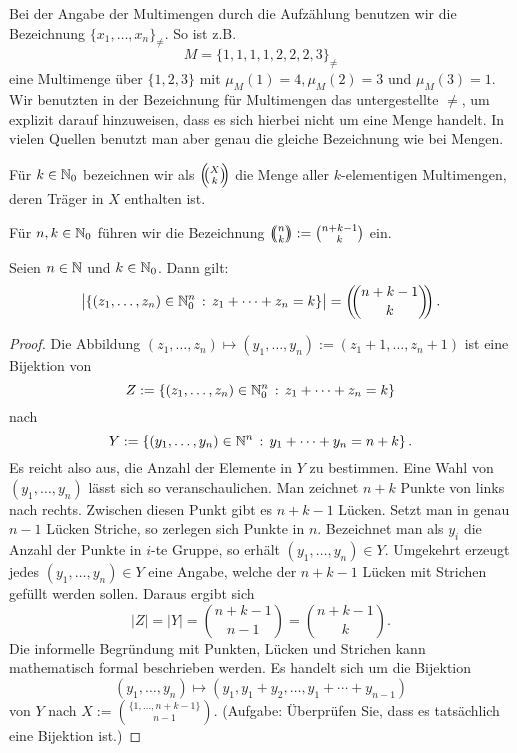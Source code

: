 \begin{bem}
	Bei der Angabe der Multimengen durch die Aufzählung benutzen wir die Bezeichnung $\{x_1,\ldots,x_n\}_{\ne}$. So ist z.B. 
	\[
			M = \{1,1,1,1,2,2,2,3\}_{\ne}
	\]
	eine Multimenge über $\{1,2,3\}$ mit $\mu_M(1) =4, \mu_M(2)=3$ und $\mu_M(3)=1$. Wir benutzten in der Bezeichnung für Multimengen das untergestellte $\ne$, um explizit darauf hinzuweisen, dass es sich hierbei nicht um eine Menge handelt. In vielen Quellen benutzt man aber genau die gleiche Bezeichnung wie bei Mengen. 
\end{bem}

\begin{defn}
	Für $k \in \mathbb{N}_0$ bezeichnen wir als $\left(\!\!\binom{X}{k}\!\!\right)$ die Menge aller $k$-elementigen Multimengen, deren Träger in  $X$ enthalten ist. 

	Für $n,k \in \mathbb{N}_0$ führen wir die Bezeichnung $\left(\!\!\binom{n}{k}\!\!\right) := \binom{n+k-1}{k}$ ein. 
\end{defn} 

\begin{lem} \label{lem:multimengen}
	Seien $n \in \mathbb{N}$ und $k \in \mathbb{N}_0$. Dann gilt: 
	\[
		\bigl| \left\{  (z_1,\ldots,z_n) \in \mathbb{N}_0^n \,:\, z_1 + \cdots + z_n = k \right\} \bigr| = \left(\!\!\binom{n+k-1}{k}\!\!\right). 
	\]
\end{lem} 
\begin{proof} 
	Die Abbildung $(z_1,\ldots,z_n) \mapsto (y_1,\ldots,y_n):=(z_1+1,\ldots,z_n+1)$ ist eine Bijektion von 
	\[
			Z:=\left\{  (z_1,\ldots,z_n) \in \mathbb{N}_0^n \,:\, z_1 + \cdots + z_n = k \right\}
	\]
	nach 
	\[
			Y:= \left\{  (y_1,\ldots,y_n) \in \mathbb{N}^n \,:\, y_1 + \cdots + y_n = n+ k \right\}. 
	\]
	Es reicht also aus, die Anzahl der Elemente in $Y$ zu bestimmen. Eine Wahl von $(y_1,\ldots,y_n)$ lässt sich so veranschaulichen. Man zeichnet $n+k$ Punkte von links nach rechts. Zwischen diesen Punkt gibt es $n+k-1$ Lücken. Setzt man in genau $n-1$ Lücken Striche, so zerlegen sich Punkte in $n$. Bezeichnet man als $y_i$ die Anzahl der Punkte in $i$-te Gruppe, so erhält $(y_1,\ldots,y_n) \in Y$. Umgekehrt erzeugt jedes $(y_1,\ldots,y_n) \in Y$ eine Angabe, welche der $n+k-1$ Lücken mit Strichen gefüllt werden sollen. Daraus ergibt sich 
	\[
			|Z| = |Y|= \binom{n+k-1}{n-1} = \binom{n+k-1}{k}. 
	\]
	Die informelle Begründung mit Punkten, Lücken und Strichen kann mathematisch formal beschrieben werden. Es handelt sich um die Bijektion 
	\[
		(y_1,\ldots,y_n) \mapsto (y_1,y_1+y_2,\ldots, y_1+ \cdots +y_{n-1})
	\] von $Y$ nach 
	\(
			X:=\binom{\{1,\ldots,n+k-1\}}{n-1}. 
	\)
	(Aufgabe: Überprüfen Sie, dass es tatsächlich eine Bijektion ist.) 
\end{proof} 

